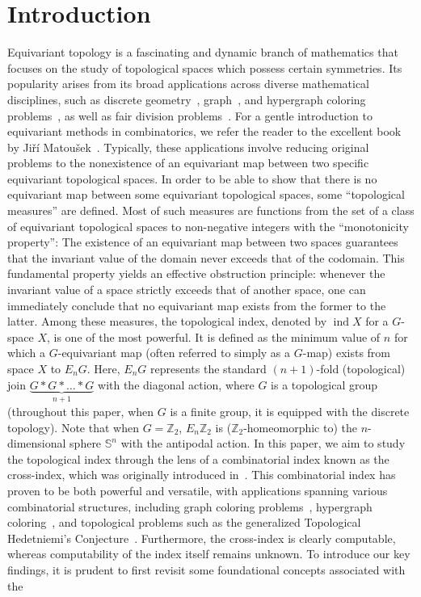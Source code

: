 \documentclass[preprint,12pt]{article}
\theoremstyle{definition}
\theoremstyle{remark}
\numberwithin{equation}{section}
\DeclareMathOperator{\ind}{ind}
\begin{document}
\section{Introduction}


Equivariant topology is a fascinating and dynamic branch of mathematics that focuses on the study of topological spaces which possess certain symmetries. Its popularity arises from its broad applications across diverse mathematical disciplines, such as discrete geometry~\cite{vzivaljevic2017topological,blagojevic2017beyond}, graph~\cite{lovasz1978kneser,daneshpajouh2018new, chen2015multichromatic, daneshpajouh2021neighborhood}, and hypergraph coloring problems~\cite{alon1986chromatic, alishahi2015chromatic,daneshpajouh2023hedetniemi, frick2020chromatic}, as well as fair division problems~\cite{de2013course,avvakumov2021envy}. For a gentle introduction to equivariant methods in combinatorics, we refer the reader to the excellent book by Ji\v{r}\'{i} Matou\v{s}ek~\cite{matouvsek2003using}. Typically, these applications involve reducing original problems to the nonexistence of an equivariant map between two specific equivariant topological spaces. In order to be able to show that there is no equivariant map between some equivariant topological spaces, some ``topological measures'' are defined. Most of such measures are functions from the set of a class of equivariant topological spaces to non-negative integers with the ``monotonicity property'': The existence of an equivariant map between two spaces guarantees that the invariant value of the domain never exceeds that of the codomain. This fundamental property yields an effective obstruction principle: whenever the invariant value of a space strictly exceeds that of another space, one can immediately conclude that no equivariant map exists from the former to the latter. Among these measures, the topological index, denoted by $\ind X$ for a $G$-space $X$, is one of the most powerful. It is defined as the minimum value of $n$ for which a $G$-equivariant map (often referred to simply as a $G$-map) exists from space $X$ to $E_nG$. Here, $E_nG$ represents the standard $(n+1)$-fold (topological) join $\underbrace{G*G*\dots *G}_{n+1}$ with the diagonal action, where $G$ is a topological group (throughout this paper, when \(G\) is a finite group, it is equipped with the discrete topology).  Note that when $G=\mathbb{Z}_2$, $E_n\mathbb{Z}_2$ is ($\mathbb Z_2$-homeomorphic to) the $n$-dimensional sphere $\mathbb{S}^n$ with the antipodal action. In this paper, we aim to study the topological index through the lens of a combinatorial index known as the cross-index, which was originally introduced in~\cite{Sim}. This combinatorial index has proven to be both powerful and versatile, with applications spanning various combinatorial structures, including graph coloring problems~\cite{Sim,daneshpajouh2021colorings, daneshpajouh2025box}, hypergraph coloring~\cite{Ali}, and topological problems such as the generalized Topological Hedetniemi's Conjecture~\cite{bui2023topological}. Furthermore, the cross-index is clearly computable, whereas computability of the index itself remains unknown. To introduce our key findings, it is prudent to first revisit some foundational concepts associated with the 
\end{document}
